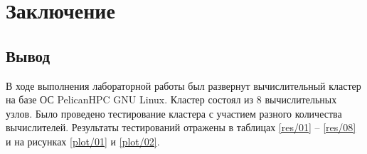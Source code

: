 \chapter{Заключение}

\section{Вывод}

В ходе выполнения лабораторной работы был развернут вычислительный кластер на базе ОС PelicanHPC GNU Linux. Кластер состоял из 8 вычислительных узлов. Было проведено тестирование кластера с участием разного количества вычислителей. Результаты тестирований отражены в таблицах \ref{res/01} -- \ref{res/08} и на рисунках \ref{plot/01} и \ref{plot/02}.